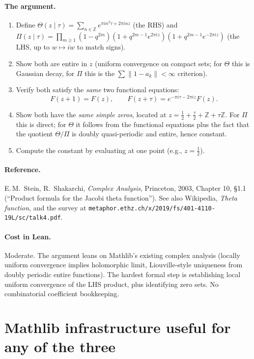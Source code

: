 \paragraph{The argument.}
\begin{enumerate}\item Define $\Theta(z \mid \tau) = \sum_{n \in \mathbb{Z}} e^{\pi i n^2 \tau + 2\pi i n z}$ (the RHS) and
$\Pi(z \mid \tau) = \prod_{m \geq 1} (1 - q^{2m})(1 + q^{2m-1} e^{2\pi i z})(1 + q^{2m-1} e^{-2\pi i z})$ (the LHS, up to $w \mapsto i w$ to match signs).
\item Show both are entire in $z$ (uniform convergence on compact sets; for $\Theta$ this is Gaussian decay, for $\Pi$ this is the $\sum \|1 - a_k\| < \infty$ criterion).
\item Verify both satisfy the \emph{same} two functional equations:
\[
F(z+1) = F(z), \qquad F(z + \tau) = e^{-\pi i \tau - 2\pi i z} F(z).
\]
\item Show both have the \emph{same simple zeros}, located at $z = \tfrac{1}{2} + \tfrac{\tau}{2} + \mathbb{Z} + \tau \mathbb{Z}$. For $\Pi$ this is direct; for $\Theta$ it follows from the functional equations plus the fact that the quotient $\Theta/\Pi$ is doubly quasi-periodic and entire, hence constant.
\item Compute the constant by evaluating at one point (e.g., $z = \tfrac{1}{2}$).
\end{enumerate}

\paragraph{Reference.} E.\,M.\ Stein, R.\ Shakarchi, \emph{Complex Analysis}, Princeton, 2003, Chapter 10, \S 1.1 (``Product formula for the Jacobi theta function''). See also Wikipedia, \emph{Theta function}, and the survey at \texttt{metaphor.ethz.ch/x/2019/fs/401-4110-19L/sc/talk4.pdf}.

\paragraph{Cost in Lean.} Moderate. The argument leans on Mathlib's existing complex analysis (locally uniform convergence implies holomorphic limit, Liouville-style uniqueness from doubly periodic entire functions). The hardest formal step is establishing local uniform convergence of the LHS product, plus identifying zero sets. No combinatorial coefficient bookkeeping.

\section{Mathlib infrastructure useful for any of the three}

